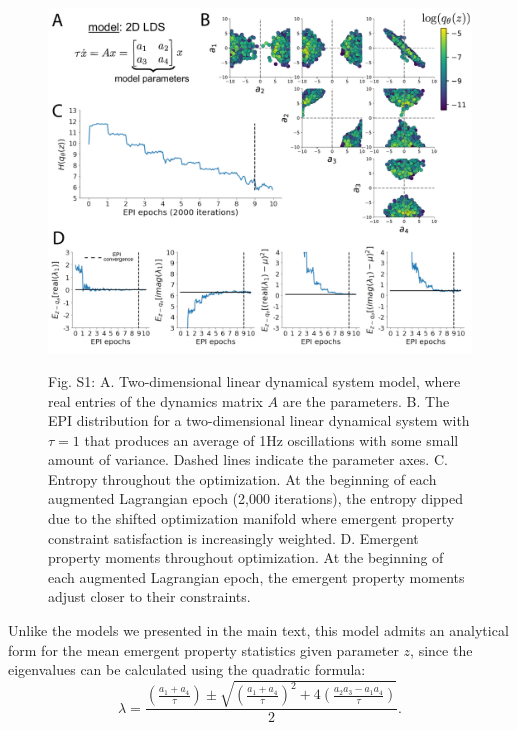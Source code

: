 \documentclass[11pt]{article}
\begin{document}
\begin{figure}
\begin{center}
\includegraphics[scale=0.58]{figures/figS1/figS1.pdf}
\end{center}
\begin{flushleft}
{\small Fig. S1: A. Two-dimensional linear dynamical system model, where real entries of the dynamics matrix $A$ are the parameters.  B. The EPI distribution for a two-dimensional linear dynamical system with $\tau=1$ that produces an average of 1Hz oscillations with some small amount of variance.  Dashed lines indicate the parameter axes. C. Entropy throughout the optimization.  At the beginning of each augmented Lagrangian epoch (2,000 iterations), the entropy dipped due to the shifted optimization manifold where emergent property constraint satisfaction is increasingly weighted.  D. Emergent property moments throughout optimization.  At the beginning of each augmented Lagrangian epoch, the emergent property moments adjust closer to their constraints.}
\end{flushleft}
\end{figure}

Unlike the models we presented in the main text, this model admits an analytical form for the mean emergent property statistics given parameter $z$, since the eigenvalues can be calculated using the quadratic formula: 
\begin{equation}
\lambda = \frac{(\frac{a_1 + a_4}{\tau}) \pm \sqrt{(\frac{a_1+a_4}{\tau})^2 + 4(\frac{a_2 a_3 - a_1 a_4}{\tau})}}{2}.
\end{equation}
\end{document}

